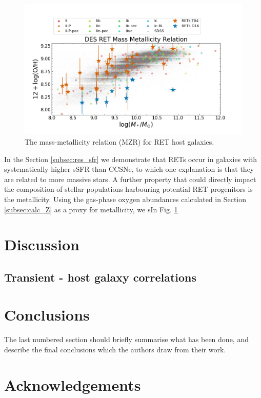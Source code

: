 \documentclass[fleqn,usenatbib,]{mnras}
\begin{document}
\begin{figure}
\includegraphics[width=\textwidth]{figs/RET_MZR.png}
\caption{The mass-metallicity relation (MZR) for RET host galaxies.
\label{fig:mzr}}
\end{figure}

In the Section \ref{subsec:res_sfr} we demonstrate that RETs occur in galaxies with systematically higher sSFR than CCSNe, to which one explanation is that they are related to more massive stars. A further property that could directly impact the composition of stellar populations harbouring potential RET progenitors is the metallicity. Using the gas-phase oxygen abundances calculated in Section \ref{subsec:calc_Z} as a proxy for metallicity, we sIn Fig. \ref{fig:mzr}



\section{Discussion \label{sec:disc}}

\subsection{Transient - host galaxy correlations}



\section{Conclusions}

The last numbered section should briefly summarise what has been done, and describe
the final conclusions which the authors draw from their work.

\section*{Acknowledgements}
\end{document}
